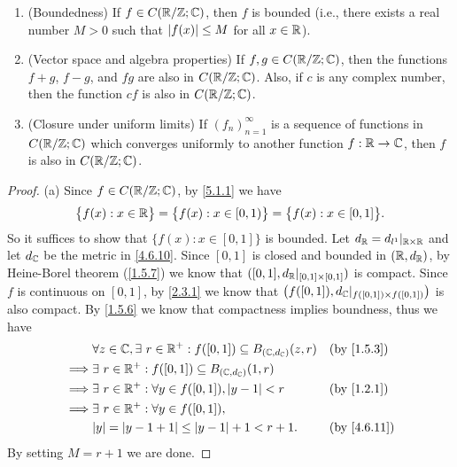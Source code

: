 \begin{lem}\label{5.1.5}
  \quad
  \begin{enumerate}
    \item (Boundedness)
          If \(f \in C(\mathbb{R} / \mathbb{Z} ; \mathbb{C})\), then \(f\) is bounded
          (i.e., there exists a real number \(M > 0\) such that \(\left\lvert f(x)\right\rvert \leq M\) for all \(x \in \mathbb{R}\)).
    \item (Vector space and algebra properties)
          If \(f, g \in C(\mathbb{R} / \mathbb{Z} ; \mathbb{C})\), then the functions \(f + g\), \(f - g\), and \(f g\) are also in \(C(\mathbb{R} / \mathbb{Z} ; \mathbb{C})\).
          Also, if \(c\) is any complex number, then the function \(cf\) is also in \(C(\mathbb{R} / \mathbb{Z} ; \mathbb{C})\).
    \item (Closure under uniform limits)
          If \((f_n)_{n = 1}^\infty\) is a sequence of functions in \(C(\mathbb{R} / \mathbb{Z} ; \mathbb{C})\) which converges uniformly to another function \(f : \mathbb{R} \to \mathbb{C}\), then \(f\) is also in \(C(\mathbb{R} / \mathbb{Z} ; \mathbb{C})\).
  \end{enumerate}
\end{lem}

\begin{proof}{(a)}
  Since \(f \in C(\mathbb{R} / \mathbb{Z} ; \mathbb{C})\), by \cref{5.1.1} we have
  \[
    \big\{f(x) : x \in \mathbb{R}\big\} = \big\{f(x) : x \in [0, 1)\big\} = \big\{f(x) : x \in [0, 1]\big\}.
  \]
  So it suffices to show that \(\{f(x) : x \in [0, 1]\}\) is bounded.
  Let \(d_{\mathbb{R}} = d_{l^1}|_{\mathbb{R} \times \mathbb{R}}\) and let \(d_{\mathbb{C}}\) be the metric in \cref{4.6.10}.
  Since \([0, 1]\) is closed and bounded in \((\mathbb{R}, d_{\mathbb{R}})\), by Heine-Borel theorem (\cref{1.5.7}) we know that \(([0, 1], d_{\mathbb{R}}|_{[0, 1] \times [0, 1]})\) is compact.
  Since \(f\) is continuous on \([0, 1]\), by \cref{2.3.1} we know that \(\big(f([0, 1]), d_{\mathbb{C}}|_{f([0, 1]) \times f([0, 1])}\big)\) is also compact.
  By \cref{1.5.6} we know that compactness implies boundness, thus we have
  \begin{align*}
             & \forall z \in \C, \exists\ r \in \R^+ : f([0, 1]) \subseteq B_{(\C, d_{\C})}(z, r) &  & \text{(by \cref{1.5.3})}  \\
    \implies & \exists\ r \in \R^+ : f([0, 1]) \subseteq B_{(\C, d_{\C})}(1, r)                                                  \\
    \implies & \exists\ r \in \R^+ : \forall y \in f([0, 1]), \abs{y - 1} < r                     &  & \text{(by \cref{1.2.1})}  \\
    \implies & \exists\ r \in \R^+ : \forall y \in f([0, 1]),                                                                    \\
             & \abs{y} = \abs{y - 1 + 1} \leq \abs{y - 1} + 1 < r + 1.                            &  & \text{(by \cref{4.6.11})}
  \end{align*}
  By setting \(M = r + 1\) we are done.
\end{proof}

